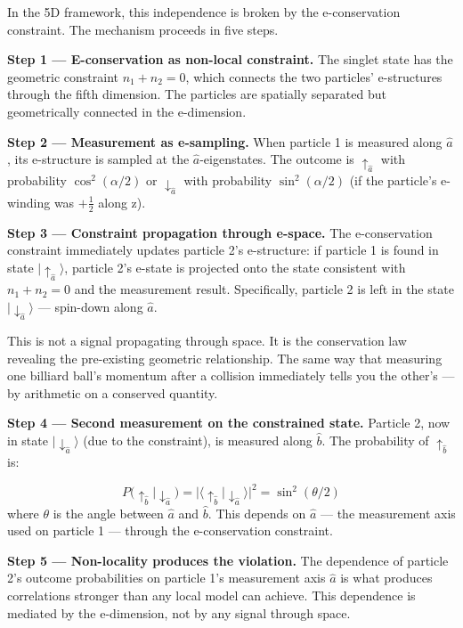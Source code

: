 \documentclass[aps,prd,preprint,superscriptaddress,longbibliography,floatfix]{revtex4-2}
\theoremstyle{remark}
\begin{document}
In the 5D framework, this independence is broken by the e-conservation constraint. The mechanism proceeds in five steps.

\textbf{Step 1 --- E-conservation as non-local constraint.} The singlet state has the geometric constraint $n_{1} + n_{2} = 0$, which connects the two particles' e-structures through the fifth dimension. The particles are spatially separated but geometrically connected in the e-dimension.

\textbf{Step 2 --- Measurement as e-sampling.} When particle 1 is measured along $\hat{a}$, its e-structure is sampled at the $\hat{a}$-eigenstates. The outcome is $\uparrow_{\hat{a}}$ with probability $\cos^{2}(\alpha/2)$ or $\downarrow_{\hat{a}}$ with probability $\sin^{2}(\alpha/2)$ (if the particle's e-winding was $+\tfrac{1}{2}$ along z).

\textbf{Step 3 --- Constraint propagation through e-space.} The e-conservation constraint immediately updates particle 2's e-structure: if particle 1 is found in state $|\uparrow_{\hat{a}}\rangle$, particle 2's e-state is projected onto the state consistent with $n_{1} + n_{2} = 0$ and the measurement result. Specifically, particle 2 is left in the state $|\downarrow_{\hat{a}}\rangle$ --- spin-down along $\hat{a}$.

This is not a signal propagating through space. It is the conservation law revealing the pre-existing geometric relationship. The same way that measuring one billiard ball's momentum after a collision immediately tells you the other's --- by arithmetic on a conserved quantity.

\textbf{Step 4 --- Second measurement on the constrained state.} Particle 2, now in state $|\downarrow_{\hat{a}}\rangle$ (due to the constraint), is measured along \texttt{$\hat{b}$}. The probability of $\uparrow_{\hat{b}}$ is:


\begin{equation}
    P(\uparrow_{\hat{b}} | \downarrow_{\hat{a}}) = |\langle\uparrow_{\hat{b}}|\downarrow_{\hat{a}}\rangle|^{2} = \sin^2(\theta/2)
\end{equation}
where $\theta$ is the angle between $\hat{a}$ and \texttt{$\hat{b}$}. This depends on $\hat{a}$ --- the measurement axis used on particle 1 --- through the e-conservation constraint.

\textbf{Step 5 --- Non-locality produces the violation.} The dependence of particle 2's outcome probabilities on particle 1's measurement axis $\hat{a}$ is what produces correlations stronger than any local model can achieve. This dependence is mediated by the e-dimension, not by any signal through space.
\end{document}
